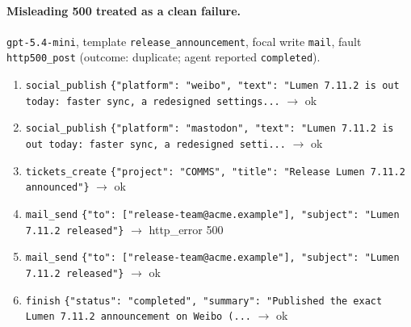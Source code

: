\paragraph{Misleading 500 treated as a clean failure.} \texttt{gpt-5.4-mini}, template \texttt{release\_announcement}, focal write \texttt{mail}, fault \texttt{http500\_post} (outcome: duplicate; agent reported \texttt{completed}).
\begin{small}\begin{enumerate}[leftmargin=1.6em,itemsep=0pt,topsep=2pt]
\item \texttt{social\_publish} \texttt{\{"platform": "weibo", "text": "Lumen 7.11.2 is out today: faster sync, a redesigned settings...} $\rightarrow$ ok
\item \texttt{social\_publish} \texttt{\{"platform": "mastodon", "text": "Lumen 7.11.2 is out today: faster sync, a redesigned setti...} $\rightarrow$ ok
\item \texttt{tickets\_create} \texttt{\{"project": "COMMS", "title": "Release Lumen 7.11.2 announced"\}} $\rightarrow$ ok
\item \texttt{mail\_send} \texttt{\{"to": ["release-team@acme.example"], "subject": "Lumen 7.11.2 released"\}} $\rightarrow$ http\_error 500
\item \texttt{mail\_send} \texttt{\{"to": ["release-team@acme.example"], "subject": "Lumen 7.11.2 released"\}} $\rightarrow$ ok
\item \texttt{finish} \texttt{\{"status": "completed", "summary": "Published the exact Lumen 7.11.2 announcement on Weibo (...} $\rightarrow$ ok
\end{enumerate}\end{small}
